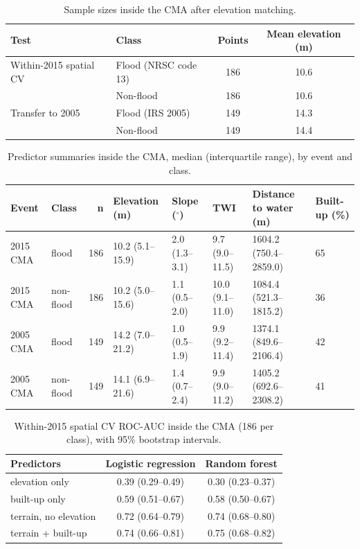 \begin{table}[h]
\centering
\caption{Sample sizes inside the CMA after elevation matching.}
\label{tab:samples}
\begin{tabular}{llcc}
\toprule
Test & Class & Points & Mean elevation (m) \\
\midrule
Within-2015 spatial CV & Flood (NRSC code 13) & 186 & 10.6 \\
 & Non-flood & 186 & 10.6 \\
Transfer to 2005 & Flood (IRS 2005) & 149 & 14.3 \\
 & Non-flood & 149 & 14.4 \\
\bottomrule
\end{tabular}
\end{table}

\begin{table}[h]
\centering
\caption{Predictor summaries inside the CMA, median (interquartile range), by event and class.}
\label{tab:summary}
\begin{tabular}{llrlllll}
\toprule
Event & Class & n & Elevation (m) & Slope ($^\circ$) & TWI & Distance to water (m) & Built-up (\%) \\
\midrule
2015 CMA & flood & 186 & 10.2 (5.1--15.9) & 2.0 (1.3--3.1) & 9.7 (9.0--11.5) & 1604.2 (750.4--2859.0) & 65 \\
2015 CMA & non-flood & 186 & 10.2 (5.0--15.6) & 1.1 (0.5--2.0) & 10.0 (9.1--11.0) & 1084.4 (521.3--1815.2) & 36 \\
2005 CMA & flood & 149 & 14.2 (7.0--21.2) & 1.0 (0.5--1.9) & 9.9 (9.2--11.4) & 1374.1 (849.6--2106.4) & 42 \\
2005 CMA & non-flood & 149 & 14.1 (6.9--21.6) & 1.4 (0.7--2.4) & 9.9 (9.0--11.2) & 1405.2 (692.6--2308.2) & 41 \\
\bottomrule
\end{tabular}
\end{table}

\begin{table}[h]
\centering
\caption{Within-2015 spatial CV ROC-AUC inside the CMA (186 per class), with 95\% bootstrap intervals.}
\label{tab:within}
\begin{tabular}{lcc}
\toprule
Predictors & Logistic regression & Random forest \\
\midrule
elevation only & 0.39 (0.29--0.49) & 0.30 (0.23--0.37) \\
built-up only & 0.59 (0.51--0.67) & 0.58 (0.50--0.67) \\
terrain, no elevation & 0.72 (0.64--0.79) & 0.74 (0.68--0.80) \\
terrain + built-up & 0.74 (0.66--0.81) & 0.75 (0.68--0.82) \\
\bottomrule
\end{tabular}
\end{table}

